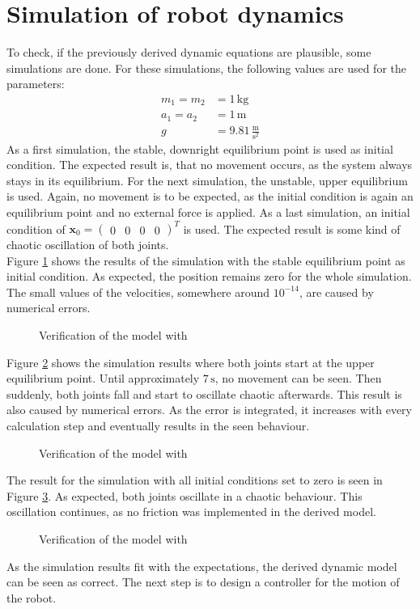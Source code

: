 \section{Simulation of robot dynamics}
To check, if the previously derived dynamic equations are plausible, some simulations are done. For these simulations, the following values are used for the parameters:
\begin{align*}
	m_1 = m_2 &= 1\,\mathrm{kg}\\
	a_1 = a_2 &= 1\,\mathrm{m}\\
	g &= 9.81\,\mathrm{\frac{m}{s^2}}
\end{align*}As a first simulation, the stable, downright equilibrium point is used as initial condition. The expected result is, that no movement occurs, as the system always stays in its equilibrium. For the next simulation, the unstable, upper equilibrium is used. Again, no movement is to be expected, as the initial condition is again an equilibrium point and no external force is applied. As a last simulation, an initial condition of $\mathbf{x}_0 =\left( \begin{array}{cccc}
	0 & 0 & 0 & 0
\end{array}\right)^T$ is used. The expected result is some kind of chaotic oscillation of both joints.\\
Figure \ref{fig:ch1_model1} shows the results of the simulation with the stable equilibrium point as initial condition. As expected, the position remains zero for the whole simulation. The small values of the velocities, somewhere around $10^{-14}$, are caused by numerical errors.
\begin{figure}[H]
	\centering
	
	\caption{Verification of the model with \usebox{\modeli}}
	\label{fig:ch1_model1}
\end{figure}
Figure \ref{fig:ch1_model2} shows the simulation results where both joints start at the upper equilibrium point. Until approximately $7\,\mathrm{s}$, no movement can be seen. Then suddenly, both joints fall and start to oscillate chaotic afterwards. This result is also caused by numerical errors. As the error is integrated, it increases with every calculation step and eventually results in the seen behaviour.
\begin{figure}[H]
	\centering
	
	\caption{Verification of the model with \usebox{\modelii}}
	\label{fig:ch1_model2}
\end{figure}
The result for the simulation with all initial conditions set to zero is seen in Figure \ref{fig:ch1_model3}. As expected, both joints oscillate in a chaotic behaviour. This oscillation continues, as no friction was implemented in the derived model.
\begin{figure}[H]
	\centering
	
	\caption{Verification of the model with \usebox{\modeliii}}
	\label{fig:ch1_model3}
\end{figure}
As the simulation results fit with the expectations, the derived dynamic model can be seen as correct. The next step is to design a controller for the motion of the robot.